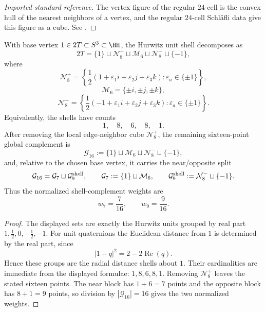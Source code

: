 \documentclass[11pt]{article}
\begin{document}
\begin{proof}[Imported standard reference]
The vertex figure of the regular \(24\)-cell is the convex hull of the nearest neighbors of a vertex, and the regular \(24\)-cell Schl\"afli data give this figure as a cube. See \cite{coxeter1973regular}.
\end{proof}


\begin{theorem}
\label{p1:thm:hurwitz-radial-shells}
With base vertex \(1\in 2T\subset S^3\subset\HH\), the Hurwitz unit shell decomposes as
\[
2T=
\{1\}
\sqcup \mathcal N_8^+
\sqcup \mathcal M_6
\sqcup \mathcal N_8^-
\sqcup \{-1\},
\]
where
\[
\mathcal N_8^+
=
\left\{\frac12(1+\varepsilon_1 i+\varepsilon_2 j+\varepsilon_3 k):
\varepsilon_a\in\{\pm1\}\right\},
\]
\[
\mathcal M_6=\{\pm i,\pm j,\pm k\},
\]
\[
\mathcal N_8^-
=
\left\{\frac12(-1+\varepsilon_1 i+\varepsilon_2 j+\varepsilon_3 k):
\varepsilon_a\in\{\pm1\}\right\}.
\]
Equivalently, the shells have counts
\[
1,
\quad 8,
\quad 6,
\quad 8,
\quad 1.
\]
After removing the local edge-neighbor cube \(\mathcal N_8^+\), the remaining
sixteen-point global complement is
\[
\mathcal G_{16}
:=\{1\}\sqcup\mathcal M_6\sqcup\mathcal N_8^-\sqcup\{-1\},
\]
and, relative to the chosen base vertex, it carries the near/opposite split
\[
\mathcal G_{16}=\mathcal G_7\sqcup\mathcal G_9^{\rm shell},
\qquad
\mathcal G_7:=\{1\}\sqcup\mathcal M_6,
\qquad
\mathcal G_9^{\rm shell}:=\mathcal N_8^-\sqcup\{-1\}.
\]
Thus the normalized shell-complement weights are
\[
 w_7=\frac{7}{16},
 \qquad
 w_9=\frac{9}{16}.
\]
\end{theorem}

\begin{proof}
The displayed sets are exactly the Hurwitz units grouped by real part
\(1,\frac12,0,-\frac12,-1\).  For unit quaternions the Euclidean distance from
\(1\) is determined by the real part, since
\[
|1-q|^2=2-2\operatorname{Re}(q).
\]
Hence these groups are the radial distance shells about \(1\).  Their
cardinalities are immediate from the displayed formulae: \(1,8,6,8,1\).  Removing
\(\mathcal N_8^+\) leaves the stated sixteen points.  The near block has
\(1+6=7\) points and the opposite block has \(8+1=9\) points, so division by
\(|\mathcal G_{16}|=16\) gives the two normalized weights.
\end{proof}
\end{document}
